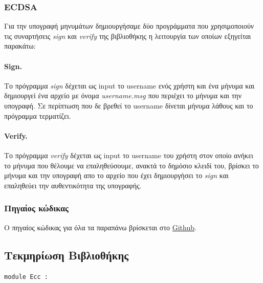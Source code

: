 \documentclass[12pt]{article}
\begin{document}
\subsubsection{ECDSA}
Για την υπογραφή μηνυμάτων δημιουργήσαμε δύο προγράμματα που χρησιμοποιούν τις συναρτήσεις \emph{sign} και \emph{verify} της βιβλιοθήκης η λειτουργία των οποίων εξηγείται παρακάτω:
\paragraph{Sign.} Το πρόγραμμα \emph{sign} δέχεται ως input το username ενός χρήστη και ένα μήνυμα και δημιουργεί ένα αρχείο με όνομα \emph{username.msg} που περιέχει το μήνυμα και την υπογραφή. Σε περίπτωση που δε βρεθεί το username δίνεται μήνυμα λάθους και το πρόγραμμα τερματίζει.
\paragraph{Verify.} Το πρόγραμμα \emph{verify} δέχεται ως input το username του χρήστη στον οποίο ανήκει το μήνυμα που θέλουμε να επαληθεύσουμε, ανακτά το δημόσιο κλειδί του, βρίσκει το μήνυμα και την υπογραφή απο το αρχείο που έχει δημιουργήσει το \emph{sign} και επαληθεύει την αυθεντικότητα της υπογραφής.
\subsubsection{Πηγαίος κώδικας}
Ο πηγαίος κώδικας για όλα τα παραπάνω βρίσκεται στο \href{https://github.com/zoep/ECC-OCaml}{Github}.
\subsection{Τεκμηρίωση Βιβλιοθήκης}

\begin{ocamldoccode}
{\tt{module }}{\tt{Ecc}}{\tt{ : }}\end{ocamldoccode}
\label{module:Ecc.Ecc}
\end{document}
